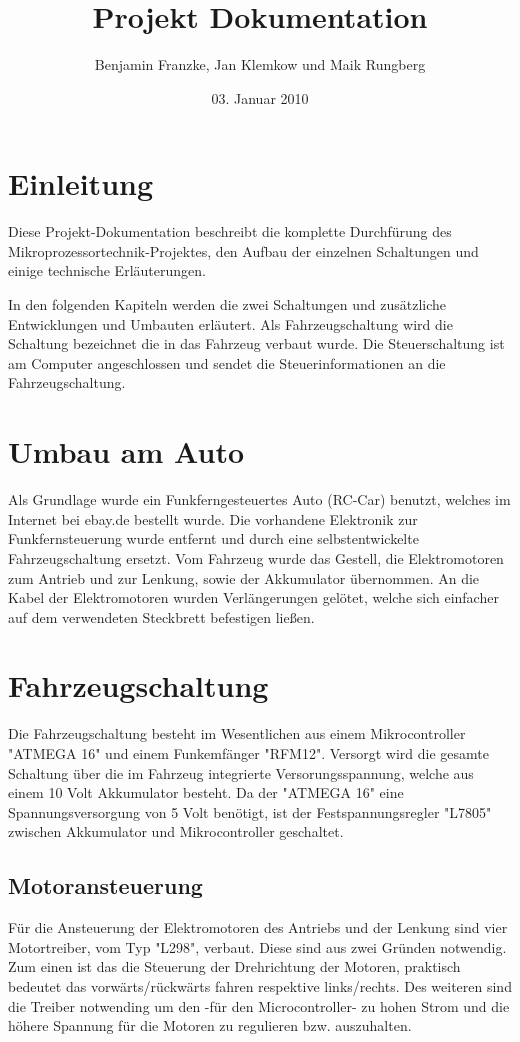 \documentclass{scrartcl}
\title{Projekt Dokumentation}
\author{Benjamin Franzke, Jan Klemkow und Maik Rungberg}
\date{03. Januar 2010}
\begin{document}
\maketitle
\tableofcontents

\newpage

\section{Einleitung} %
	Diese Projekt-Dokumentation beschreibt die komplette Durchfürung des Mikroprozessortechnik-Projektes,
	den Aufbau der einzelnen Schaltungen und einige technische Erläuterungen.

	In den folgenden Kapiteln werden die zwei Schaltungen und zusätzliche Entwicklungen und Umbauten erläutert.
	Als Fahrzeugschaltung wird die Schaltung bezeichnet die in das Fahrzeug verbaut wurde.
	Die Steuerschaltung ist am Computer angeschlossen und sendet die Steuerinformationen an die Fahrzeugschaltung.

\section{Umbau am Auto} %
	Als Grundlage wurde ein Funkferngesteuertes Auto (RC-Car) benutzt,
	welches im Internet bei ebay.de bestellt wurde.
	Die vorhandene Elektronik zur Funkfernsteuerung wurde entfernt
	und durch eine selbstentwickelte Fahrzeugschaltung ersetzt.
	Vom Fahrzeug wurde das Gestell, die Elektromotoren zum Antrieb und zur Lenkung,
	sowie der Akkumulator übernommen.
	An die Kabel der Elektromotoren wurden Verlängerungen gelötet,
	welche sich einfacher auf dem verwendeten Steckbrett befestigen ließen.

\newpage

\section{Fahrzeugschaltung} %
	Die Fahrzeugschaltung besteht im Wesentlichen aus einem Mikrocontroller "ATMEGA 16" und einem Funkemfänger "RFM12".
	Versorgt wird die gesamte Schaltung über die im Fahrzeug integrierte Versorungsspannung,
	welche aus einem 10 Volt Akkumulator besteht.
	Da der "ATMEGA 16" eine Spannungsversorgung von 5 Volt benötigt, ist der Festspannungsregler "L7805"
	zwischen Akkumulator und Mikrocontroller geschaltet.

	\subsection{Motoransteuerung}
		Für die Ansteuerung der Elektromotoren des Antriebs und der Lenkung sind vier Motortreiber, vom Typ "L298", verbaut.
		Diese sind aus zwei Gründen notwendig. Zum einen ist das die Steuerung der Drehrichtung der Motoren, praktisch
		bedeutet das vorwärts/rückwärts fahren respektive links/rechts.
		Des weiteren sind die Treiber notwending um den -für den Microcontroller- zu hohen Strom und die höhere Spannung
		für die Motoren zu regulieren bzw. auszuhalten.
\end{document}

